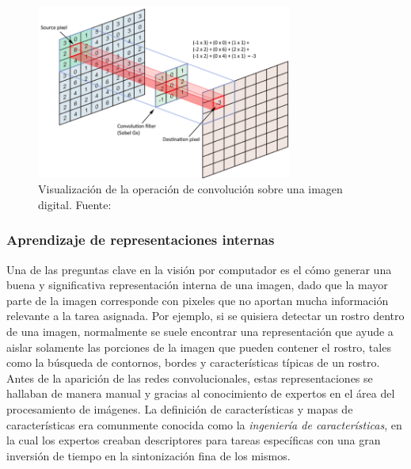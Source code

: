         \begin{figure}[!h] 
            \centering
            \includegraphics[width=0.75\textwidth]{img/convolucion}
            \caption{Visualización de la operación de convolución sobre una imagen digital. Fuente: \cite{cornelisse_2018} }
            \label{fig:convolucion}
        \end{figure}


        

        \subsubsection{Aprendizaje de representaciones internas}
        Una de las preguntas clave en la visión por computador es el cómo generar una buena y significativa
        representación interna de una imagen, dado que la mayor parte de la imagen corresponde con pixeles que no 
        aportan mucha información relevante a la tarea asignada. Por ejemplo, si se quisiera detectar 
        un rostro dentro de una imagen, normalmente se suele encontrar una representación que ayude a aislar solamente 
        las porciones de la imagen que pueden contener el rostro, tales como la búsqueda de contornos, bordes y 
        características típicas de un rostro. Antes de la aparición de las redes convolucionales, estas representaciones 
        se hallaban de manera manual y gracias al conocimiento de expertos en el área del procesamiento de imágenes. 
        La definición de características y mapas de características era comunmente conocida como la 
        \textit{ingeniería de características}, en la cual los expertos creaban descriptores para tareas específicas con 
        una gran inversión de tiempo en la sintonización fina de los mismos. 


